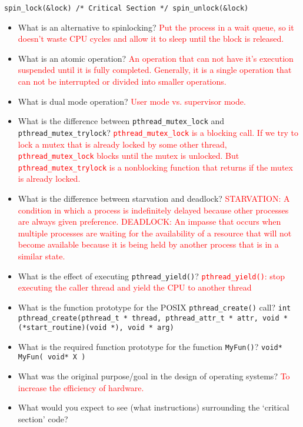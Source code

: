 \documentclass[10pt,landscape]{article}
\newcommand{\answer}[1]{\textcolor{red}{#1}}
\begin{document}
\begin{multicols}{4}
\begin{lstlisting}[style=cC++]
    spin_lock(&lock) /* Critical Section */ spin_unlock(&lock)
\end{lstlisting}

\begin{itemize}
    \item What is an alternative to spinlocking?  \answer{Put the process in a wait queue, so it doesn't waste CPU cycles and allow it to sleep until the block is released.}
    \item What is an atomic operation? \answer{An operation that can not have it's execution suspended until it is fully completed. Generally, it is a single operation that can not be interrupted or divided into smaller operations.}
    \item What is dual mode operation? \answer{User mode vs. supervisor mode.}
    \item What is the difference between \verb$pthread_mutex_lock$ and \verb$pthread_mutex_trylock$? \answer{\texttt{pthread\_mutex\_lock} is a blocking call. If we try to lock a mutex that is already locked by some other thread, \texttt{pthread\_mutex\_lock} blocks until the mutex is unlocked. But \texttt{pthread\_mutex\_trylock} is a nonblocking function that returns if the mutex is already locked.}
    \item What is the difference between starvation and deadlock?  \answer{STARVATION: A condition in which a process is indefinitely delayed because other processes are always given preference. DEADLOCK: An impasse that occurs when multiple processes are waiting for the availability of a resource that will not become available because it is being held by another process that is in a similar state.}
    \item What is the effect of executing \verb$pthread_yield()$?  \answer{\texttt{pthread\_yield()}: stop executing the caller thread and yield the CPU to another thread}
    \item What is the function prototype for the POSIX \verb$pthread_create()$ call? \texttt{int pthread\_create(pthread\_t  *  thread, pthread\_attr\_t * attr, void * (*start\_routine)(void *), void * arg)}

    \item What is the required function prototype for the function \verb|MyFun()|? \verb|void* MyFun( void* X )|
    \item What was the original purpose/goal in the design of operating systems? \answer{To increase the efficiency of hardware.}
    \item What would you expect to see (what instructions) surrounding the `critical section' code?
\end{itemize}


\end{multicols}
\end{document}

